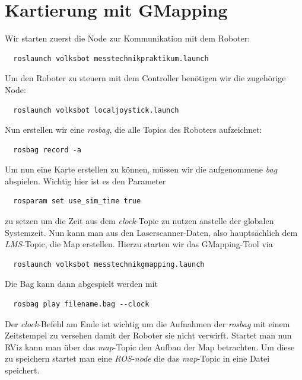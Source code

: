 \documentclass[11pt,a4paper]{article}
\begin{document}
\section{Kartierung mit GMapping}
Wir starten zuerst die Node zur Kommunikation mit dem Roboter: \begin{verbatim}
  roslaunch volksbot messtechnikpraktikum.launch
\end{verbatim}
Um den Roboter zu steuern mit dem Controller benötigen wir die zugehörige Node: \begin{verbatim}
  roslaunch volksbot localjoystick.launch
\end{verbatim}
Nun erstellen wir eine \textit{rosbag}, die alle Topics des Roboters aufzeichnet: \begin{verbatim}
  rosbag record -a
\end{verbatim}
Um nun eine Karte erstellen zu können, müssen wir die aufgenommene \textit{bag} abspielen. 
Wichtig hier ist es den Parameter \begin{verbatim}
  rosparam set use_sim_time true
\end{verbatim} zu setzen um die Zeit aus dem \textit{clock}-Topic zu nutzen anstelle der globalen Systemzeit.
Nun kann man aus den Laserscanner-Daten, also hauptsächlich dem \textit{LMS}-Topic, die Map
erstellen. Hierzu starten wir das GMapping-Tool via \begin{verbatim}
  roslaunch volksbot messtechnikgmapping.launch
\end{verbatim}
Die Bag kann dann abgespielt werden mit \begin{verbatim}
  rosbag play filename.bag --clock
\end{verbatim}
Der \textit{clock}-Befehl am Ende ist wichtig um die Aufnahmen der \textit{rosbag} mit einem 
Zeitstempel zu versehen damit der Roboter sie nicht verwirft. 
Startet man nun RViz kann man über das \textit{map}-Topic den Aufbau der Map betrachten.
Um diese zu speichern startet man eine \textit{ROS-node} die das \textit{map}-Topic in
eine Datei speichert. 
\end{document}
